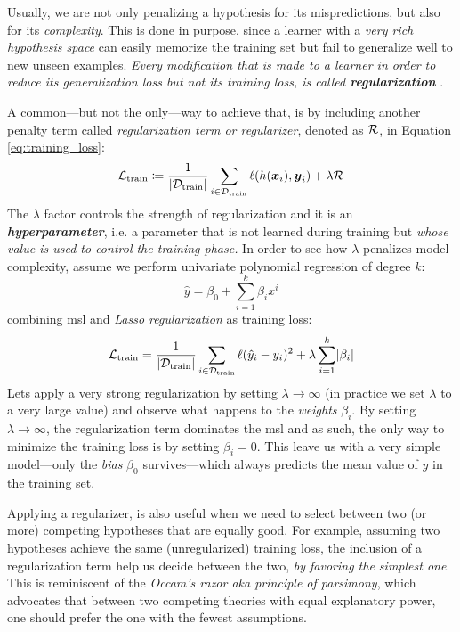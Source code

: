 Usually, we are not only penalizing a hypothesis for its mispredictions, but
also for its \emph{complexity}. This is done in purpose, since a learner with a
\emph{very rich hypothesis space} can easily memorize the training set but fail
to generalize well to new unseen examples. \emph{Every modification that is made
to a learner in order to reduce its generalization loss but not its training
loss, is called \textbf{regularization}} \parencite{deeplearning}.

A common---but not the only---way to achieve that, is by including another
penalty term called \emph{regularization term or
regularizer}, denoted as $\mathcal{R}$, in Equation
\ref{eq:training_loss}:
\begin{equation}
	\label{eq:regularization}
	\mathcal{L}_\text{train} \coloneqq \frac{1}{\lvert \mathcal{D}_\text{train} \rvert} \sum_{i \in \mathcal{D}_\text{train}}
	\ell(h(\boldsymbol{x}_i), \boldsymbol{y}_i)
	+
	\lambda \mathcal{R}
\end{equation}
The $\lambda$ factor controls the strength of regularization and it is an
\emph{\textbf{hyperparameter}}, i.e. a parameter that is
not learned during training but \emph{whose value is used to control the
training phase.} In order to see how $\lambda$ penalizes
model complexity, assume we perform univariate polynomial
regression of degree $k$:
\begin{equation}
	\hat{y} = \beta_0 + \sum_{i=1}^k \beta_i x^i
\end{equation}
combining \gls{msl} and \emph{Lasso
regularization} as training loss:
\begin{equation}
	\label{eq:lasso}
	\mathcal{L}_\text{train} = \frac{1}{\lvert \mathcal{D}_\text{train} \rvert} \sum_{i \in \mathcal{D}_\text{train}}
	\ell(\hat{y}_i - y_i)^2
	+
	\lambda \sum_{i=1}^k \lvert \beta_i \rvert
\end{equation}
Lets apply a very strong regularization by setting $\lambda \to \infty$ (in
practice we set $\lambda$ to a very large value) and observe what happens to the
\emph{weights} $\beta_i$. By setting $\lambda \to
\infty$, the regularization term dominates the \gls{msl} and as such, the only
way to minimize the training loss is by setting $\beta_i = 0$. This leave us
with a very simple model---only the \emph{bias} $\beta_0$
survives---which always predicts the mean value of $y$ in the training set.

Applying a regularizer, is also useful when we need to select
between two (or more) competing hypotheses that are equally good. For example,
assuming two hypotheses achieve the same (unregularized) training loss, the
inclusion of a regularization term help us decide between the two, \emph{by
favoring the simplest one}. This is reminiscent of the \emph{Occam's razor aka
principle of parsimony},
which advocates that between two competing theories with equal explanatory
power, one should prefer the one with the fewest assumptions.

